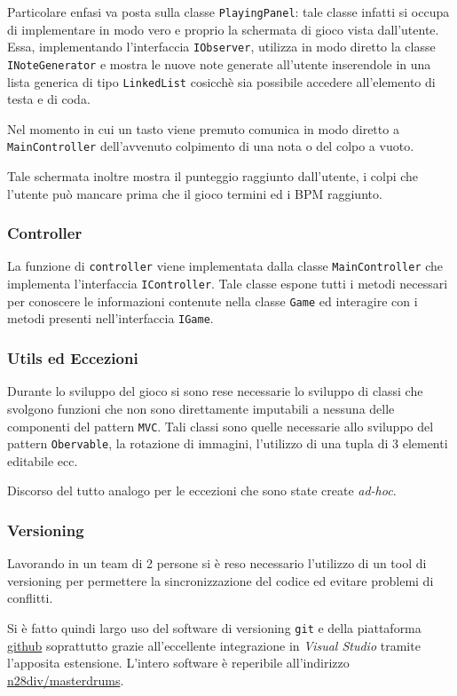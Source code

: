 \vspace{0.5cm}
Particolare enfasi va posta sulla classe \texttt{PlayingPanel}: tale classe infatti si occupa di implementare in modo vero e proprio la schermata di gioco vista dall'utente.
Essa, implementando l'interfaccia \texttt{IObserver}, utilizza in modo diretto la classe \texttt{INoteGenerator} e mostra le nuove note generate all'utente inserendole in una lista generica di tipo \texttt{LinkedList} cosicchè sia possibile accedere all'elemento di testa e di coda.

Nel momento in cui un tasto viene premuto comunica in modo diretto a \texttt{MainController} dell'avvenuto colpimento di una nota o del colpo a vuoto.

Tale schermata inoltre mostra il punteggio raggiunto dall'utente, i colpi che l'utente può mancare prima che il gioco termini ed i BPM raggiunto.

\subsubsection{Controller}
La funzione di \texttt{controller} viene implementata dalla classe \texttt{MainController} che implementa l'interfaccia \texttt{IController}.
Tale classe espone tutti i metodi necessari per conoscere le informazioni contenute nella classe \texttt{Game} ed interagire con i metodi presenti nell'interfaccia \texttt{IGame}.

\newpage
\subsubsection{Utils ed Eccezioni}
Durante lo sviluppo del gioco si sono rese necessarie lo sviluppo di classi che svolgono funzioni che non sono direttamente imputabili a nessuna delle componenti del pattern \texttt{MVC}.
Tali classi sono quelle necessarie allo sviluppo del pattern \texttt{Obervable}, la rotazione di immagini, l'utilizzo di una tupla di 3 elementi editabile ecc.

Discorso del tutto analogo per le eccezioni che sono state create \emph{ad-hoc}.

\subsubsection{Versioning}
Lavorando in un team di 2 persone si è reso necessario l'utilizzo di un tool di versioning per permettere la sincronizzazione del codice ed evitare problemi di conflitti.

Si è fatto quindi largo uso del software di versioning \texttt{git} e della piattaforma \hyperlink{https://github.com}{github} soprattutto grazie all'eccellente integrazione in \emph{Visual Studio} tramite l'apposita estensione.
L'intero software è reperibile all'indirizzo \hyperlink{https://github.com/n28div/masterdrums}{n28div/masterdrums}.

